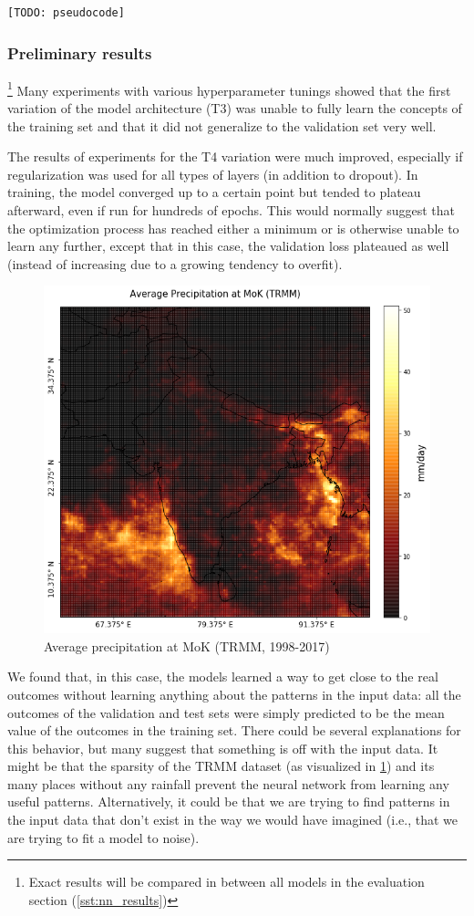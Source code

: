 \begin{figure}[h]
\end{figure}

\begin{lstlisting}[language=Python]
  [TODO: pseudocode]
\end{lstlisting}

\subsubsection{Preliminary results}{\footnote{Exact results will be compared in between all models in the evaluation section (\cref{sst:nn_results})}}
\label{ssst:nn_t3_results}
Many experiments with various hyperparameter tunings showed that the first variation of the model architecture (T3) was unable to fully learn the concepts of the training set and that it did not generalize to the validation set very well.

The results of experiments for the T4 variation were much improved, especially if regularization was used for all types of layers (in addition to dropout). In training, the model converged up to a certain point but tended to plateau afterward, even if run for hundreds of epochs. This would normally suggest that the optimization process has reached either a minimum or is otherwise unable to learn any further, except that in this case, the validation loss plateaued as well (instead of increasing due to a growing tendency to overfit).

\begin{figure}[h]
  \centering
  \includegraphics[width=0.4\linewidth]{./99_appendix/img/prec_avg_onset}
  \caption{Average precipitation at MoK (TRMM, 1998-2017)}
  \label{fig:trmm_prec_onset}
\end{figure}

We found that, in this case, the models learned a way to get close to the real outcomes without learning anything about the patterns in the input data: all the outcomes of the validation and test sets were simply predicted to be the mean value of the outcomes in the training set. There could be several explanations for this behavior, but many suggest that something is off with the input data. It might be that the sparsity of the TRMM dataset (as visualized in \cref{fig:trmm_prec_onset}) and its many places without any rainfall prevent the neural network from learning any useful patterns. Alternatively, it could be that we are trying to find patterns in the input data that don't exist in the way we would have imagined (i.e., that we are trying to fit a model to noise).

